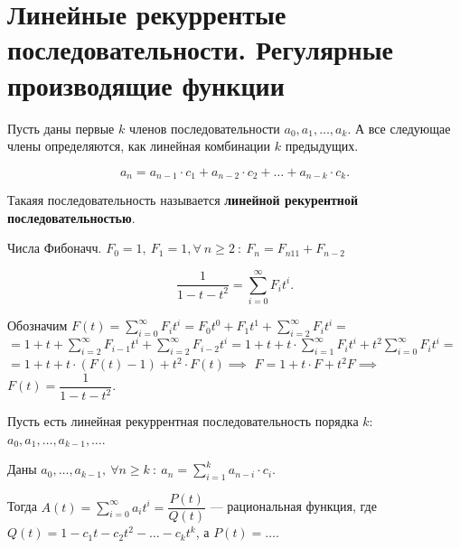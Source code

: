 
\section{Линейные рекуррентые последовательности. Регулярные производящие функции}


\begin{definition}

    Пусть даны первые $k$ членов последовательности $a_0, a_1, \dots, a_k$.
    А все следующае члены определяются, как линейная комбинации $k$ предыдущих.

    \[a_n = a_{n-1} \cdot c_1 + a_{n-2} \cdot c_2 + \dots + a_{n-k} \cdot c_k. \]

    Такаяя последовательность называется \textbf{линейной рекурентной последовательностью}.
\end{definition}

\begin{example}
    Числа Фибоначч. $F_0 = 1, ~ F_1= 1, \forall ~ n \geqslant 2 ~:~ F_n = F_{n 1 1} + F_{n - 2}$

    \[
        \dfrac{1}{1 - t - t^2} = \sum_{i=0}^{\infty} F_i t^i.
    \]
\end{example}

Обозначим $F(t) = \sum\limits_{i=0}^\infty F_i t^i = F_0 t^0 + F_1 t^1 + \sum_{i=2}^\infty F_i t^i = $\\
$ = 1 + t + \sum_{i=2}^\infty F_{i-1} t^i + \sum_{i=2}^\infty F_{i-2} t^i = 1 + t + t \cdot \sum_{i=1}^\infty F_i t^i + t^2 \sum_{i = 0}^\infty F_i t^i = $\\
$ = 1 + t + t \cdot ( F(t) - 1 ) + t^2 \cdot F(t) \implies$
$F = 1 + t \cdot F + t^2 F \implies$\\
$F(t) = \dfrac{1}{1 - t  - t^2}$.

\begin{theorem}
    Пусть есть линейная рекуррентная последовательность порядка $k$:\\
     $a_0, a_1, \dots, a_{k-1}, \dots$.
    
    Даны $a_0, \dots, a_{k-1}, ~ \forall n \geqslant k~:~ a_n = \sum_{i = 1}^k a_{n-i} \cdot c_i$.

    Тогда $A(t) = \sum_{i=0}^\infty a_i t^i = \dfrac{P(t)}{Q(t)}$ --- рациональная функция, где \\
    $Q(t) = 1 - c_1 t - c_2 t^2 - \dots - c_{k} t^k$, а $P(t) = \dots$.
\end{theorem}

